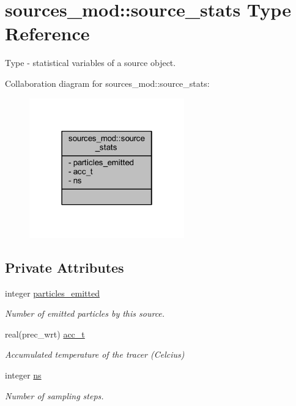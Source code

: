 \hypertarget{structsources__mod_1_1source__stats}{}\section{sources\+\_\+mod\+:\+:source\+\_\+stats Type Reference}
\label{structsources__mod_1_1source__stats}


Type -\/ statistical variables of a source object.  




Collaboration diagram for sources\+\_\+mod\+:\+:source\+\_\+stats\+:
\nopagebreak
\begin{figure}[H]
\begin{center}
\leavevmode
\includegraphics[width=190pt]{structsources__mod_1_1source__stats__coll__graph}
\end{center}
\end{figure}
\subsection*{Private Attributes}
\begin{DoxyCompactItemize}
\item 
integer \mbox{\hyperlink{structsources__mod_1_1source__stats_a2253ced036ad1a9fee933b6b08135189}{particles\+\_\+emitted}}
\begin{DoxyCompactList}\small\item\em Number of emitted particles by this source. \end{DoxyCompactList}\item 
real(prec\+\_\+wrt) \mbox{\hyperlink{structsources__mod_1_1source__stats_a0b7d9fa17124a4e891bcfc00e39473e0}{acc\+\_\+t}}
\begin{DoxyCompactList}\small\item\em Accumulated temperature of the tracer (Celcius) \end{DoxyCompactList}\item 
integer \mbox{\hyperlink{structsources__mod_1_1source__stats_a77ba33fcefa55c8d8e440844ee7f4640}{ns}}
\begin{DoxyCompactList}\small\item\em Number of sampling steps. \end{DoxyCompactList}\end{DoxyCompactItemize}


